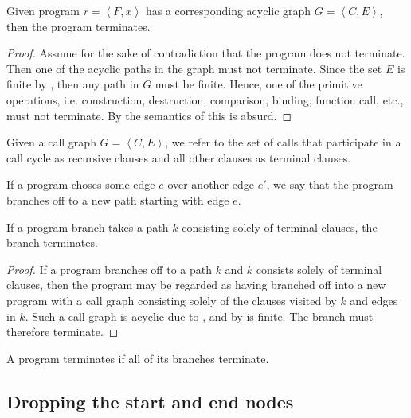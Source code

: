 \begin{theorem}\label{theorem:acyclic-graph-terminates} Given program $r=
\left\langle F, x \right\rangle$ has a corresponding acyclic graph $G =
\left\langle C,E \right\rangle$, then the program terminates.\end{theorem}

\begin{proof} Assume for the sake of contradiction that the program does not
terminate. Then one of the acyclic paths in the graph must not terminate. Since
the set $E$ is finite by , then any path
in $G$ must be finite.  Hence, one of the primitive operations, i.e.
construction, destruction, comparison, binding, function call, etc., must not
terminate. By the semantics of \D{} this is absurd.\end{proof}

\begin{definition}\label{definition:recursive-terminal} Given a call graph $G =
\left\langle C,E \right\rangle$, we refer to the set of calls that participate
in a call cycle as recursive clauses and all other clauses as terminal
clauses.\end{definition}

\begin{definition} If a program choses some edge $e$ over another edge $e'$, we
say that the program branches off to a new path starting with edge
$e$.\end{definition}

\begin{theorem} If a program branch takes a path $k$ consisting solely of
terminal clauses, the branch terminates.\end{theorem}

\begin{proof} If a program branches off to a path $k$ and $k$ consists solely
of terminal clauses, then the program may be regarded as having branched off
into a new program with a call graph consisting solely of the clauses visited
by $k$ and edges in $k$. Such a call graph is acyclic due to
, and by
 is finite. The branch must therefore
terminate.\end{proof}

\begin{corollary} A program terminates if all of its branches
terminate.\end{corollary}

\subsection{Dropping the start and end nodes}

